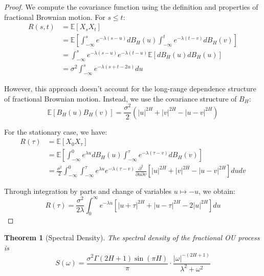 \documentclass[12pt]{article}
\newtheorem{theorem}{Theorem}
\begin{document}
\begin{proof}
We compute the covariance function using the definition and properties of fractional Brownian motion. For $s \leq t$:
\begin{align}
R(s,t) &= \mathbb{E}[X_s X_t]\\
&= \mathbb{E}\left[\int_{-\infty}^s e^{-\lambda(s-u)} dB_H(u) \int_{-\infty}^t e^{-\lambda(t-v)} dB_H(v)\right]\\
&= \int_{-\infty}^s e^{-\lambda(s-u)} e^{-\lambda(t-u)} \mathbb{E}[dB_H(u) dB_H(u)]\\
&= \sigma^2 \int_{-\infty}^s e^{-\lambda(s+t-2u)} du
\end{align}

However, this approach doesn't account for the long-range dependence structure of fractional Brownian motion. Instead, we use the covariance structure of $B_H$:
$$\mathbb{E}[B_H(u)B_H(v)] = \frac{\sigma^2}{2}(|u|^{2H} + |v|^{2H} - |u-v|^{2H})$$

For the stationary case, we have:
\begin{align}
R(\tau) &= \mathbb{E}[X_0 X_\tau]\\
&= \mathbb{E}\left[\int_{-\infty}^0 e^{\lambda u} dB_H(u) \int_{-\infty}^\tau e^{-\lambda(\tau-v)} dB_H(v)\right]\\
&= \frac{\sigma^2}{2} \int_{-\infty}^0 \int_{-\infty}^\tau e^{\lambda u} e^{-\lambda(\tau-v)} \frac{\partial^2}{\partial u \partial v}[|u|^{2H} + |v|^{2H} - |u-v|^{2H}] du dv
\end{align}

Through integration by parts and change of variables $u \mapsto -u$, we obtain:
$$R(\tau) = \frac{\sigma^2}{2\lambda} \int_0^\infty e^{-\lambda u} [|u+\tau|^{2H} + |u-\tau|^{2H} - 2|u|^{2H}] du$$
\end{proof}

\begin{theorem}[Spectral Density]
The spectral density of the fractional OU process is
\begin{equation}
S(\omega) = \frac{\sigma^2 \Gamma(2H+1) \sin(\pi H)}{\pi} \cdot \frac{|\omega|^{-(2H+1)}}{\lambda^2 + \omega^2}
\end{equation}
\end{theorem}
\end{document}
